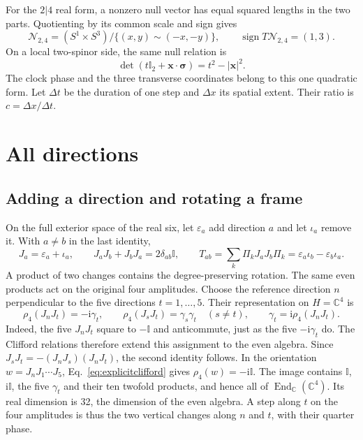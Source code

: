 \documentclass[aps,prx,onecolumn,10pt,notitlepage,nofootinbib,longbibliography]{revtex4-2}
\numberwithin{equation}{section}
\numberwithin{table}{section}
\newcommand{\Id}{\mathbb I}
\newcommand{\CC}{\mathbb C}
\newcommand{\ii}{\mathrm i}
\begin{document}
For the $2|4$ real form, a nonzero null vector has equal squared lengths in
the two parts. Quotienting by its common scale and sign gives
\begin{equation}
 \mathcal N_{2,4}=(S^1\times S^3)/\{(x,y)\sim(-x,-y)\},
 \qquad \operatorname{sign}T\mathcal N_{2,4}=(1,3).
 \label{eq:nullquotient}
\end{equation}
On a local two-spinor side, the same null relation is
\begin{equation}
 \det(t\Id_2+\bm x\cdot\bm\sigma)=t^2-|\bm x|^2.
 \label{eq:localcone}
\end{equation}
The clock phase and the three transverse coordinates belong to this one quadratic form. Let $\Delta t$ be the duration of one step and $\Delta x$ its spatial extent. Their ratio is $c=\Delta x/\Delta t$.

\section{All directions}
\label{sec:step-three}

\subsection{Adding a direction and rotating a frame}

On the full exterior space of the real six, let $\varepsilon_a$ add direction
$a$ and let $\iota_a$ remove it. With $a\ne b$ in the last identity,
\begin{equation}
 J_a=\varepsilon_a+\iota_a,\qquad
 J_aJ_b+J_bJ_a=2\delta_{ab}\Id,
 \qquad
 T_{ab}=\sum_k\Pi_kJ_aJ_b\Pi_k
       =\varepsilon_a\iota_b-\varepsilon_b\iota_a.
 \label{eq:verticalparallel}
\end{equation}
A product of two changes contains the degree-preserving rotation. The same
even products act on the original four amplitudes. Choose the reference
direction $n$ perpendicular to the five directions $t=1,\ldots,5$. Their
representation on $H=\CC^4$ is
\begin{equation}
 \rho_4(J_nJ_t)=-\ii\gamma_t,\qquad
 \rho_4(J_sJ_t)=\gamma_s\gamma_t\quad(s\ne t),\qquad
 \gamma_t=\ii\rho_4(J_nJ_t).
 \label{eq:verticalfourspinor}
\end{equation}
Indeed, the five $J_nJ_t$ square to $-\Id$ and anticommute, just as the five
$-\ii\gamma_t$ do. The Clifford relations therefore extend this assignment
to the even algebra. Since
$J_sJ_t=-(J_nJ_s)(J_nJ_t)$, the second identity follows. In the orientation
$w=J_nJ_1\cdots J_5$, Eq.~\eqref{eq:explicitclifford} gives
$\rho_4(w)=-\ii\Id$. The image contains $\Id$, $\ii\Id$, the five
$\gamma_t$ and their ten twofold products, and hence all of
$\operatorname{End}_{\CC}(\CC^4)$. Its real dimension is 32, the dimension
of the even algebra. A step along $t$ on the four amplitudes is thus the
two vertical changes along $n$ and $t$, with their quarter phase.\cite{Repository}
\end{document}
